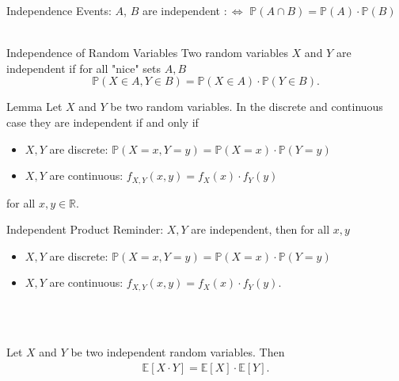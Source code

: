 \documentclass[11pt,pdf,ngerman,UKenglish]{beamer}%
\newcommand{\IR}{\mathds{R}}
\newcommand{\IP}{\mathbb{P}}
\newcommand{\IE}{{\mathbb{E}}}
\newcommand{\1}{\mathbb{1}}
\theoremstyle{thm}
\theoremstyle{def}
\begin{document}
\begin{frame}{Independence}
Events: 
$A$, $B$ are independent $:\Leftrightarrow$ $\IP(A \cap B) = \IP(A) \cdot \IP(B)$
\\ \
\pause
\begin{block}{Independence of Random Variables}
Two random variables $X$ and $Y$ are independent if for all "nice" sets $A,B$
$$ \IP( X \in A, Y \in B) = \IP(X \in A) \cdot \IP(Y \in B).$$
\end{block}

\pause
\begin{block}{Lemma}
Let $X$ and $Y$ be two random variables. In the discrete and continuous case they are independent if and only if
\begin{itemize}
\item $X,Y$ are discrete: $\IP(X=x,Y=y) = \IP(X=x) \cdot \IP(Y=y)$%
\item $X,Y$ are continuous: $f_{X,Y}(x,y) = f_X(x) \cdot f_Y(y)$
\end{itemize}
for all $x,y\in \IR$.
\end{block}
\end{frame}


\begin{frame}{Independent Product}
Reminder: $X,Y$ are independent, then for all $x,y$
\begin{itemize}
\item $X,Y$ are discrete: $\IP(X=x,Y=y) = \IP(X=x) \cdot \IP(Y=y)$%
\item $X,Y$ are continuous: $f_{X,Y}(x,y) = f_X(x) \cdot f_Y(y)$.
\end{itemize}
\ \\ \
\begin{lemma}
Let $X$ and $Y$ be two independent random variables. Then
\begin{align*}
\IE [ X \cdot Y ] = \IE[X] \cdot \IE [ Y ].
\end{align*}
\end{lemma}
\vfill
\vfill
\end{frame}



%
\end{document}
